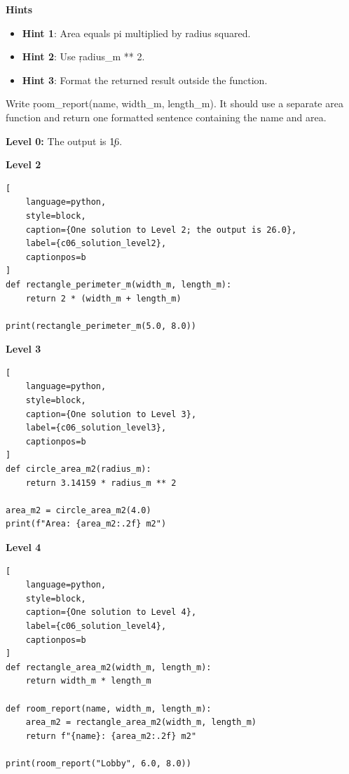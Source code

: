\textbf{Hints}
\begin{itemize}
    \item \textbf{Hint 1}: Area equals pi multiplied by radius squared.
    \item \textbf{Hint 2}: Use \c{radius_m ** 2}.
    \item \textbf{Hint 3}: Format the returned result outside the function.
\end{itemize}


Write \c{room_report(name, width_m, length_m)}. It should use a separate area
function and return one formatted sentence containing the name and area.


\textbf{Level 0:} The output is \c{16}.

\textbf{Level 2}

\begin{lstlisting}[
    language=python,
    style=block,
    caption={One solution to Level 2; the output is 26.0},
    label={c06_solution_level2},
    captionpos=b
]
def rectangle_perimeter_m(width_m, length_m):
    return 2 * (width_m + length_m)

print(rectangle_perimeter_m(5.0, 8.0))
\end{lstlisting}

\textbf{Level 3}

\begin{lstlisting}[
    language=python,
    style=block,
    caption={One solution to Level 3},
    label={c06_solution_level3},
    captionpos=b
]
def circle_area_m2(radius_m):
    return 3.14159 * radius_m ** 2

area_m2 = circle_area_m2(4.0)
print(f"Area: {area_m2:.2f} m2")
\end{lstlisting}

\textbf{Level 4}

\begin{lstlisting}[
    language=python,
    style=block,
    caption={One solution to Level 4},
    label={c06_solution_level4},
    captionpos=b
]
def rectangle_area_m2(width_m, length_m):
    return width_m * length_m

def room_report(name, width_m, length_m):
    area_m2 = rectangle_area_m2(width_m, length_m)
    return f"{name}: {area_m2:.2f} m2"

print(room_report("Lobby", 6.0, 8.0))
\end{lstlisting}

